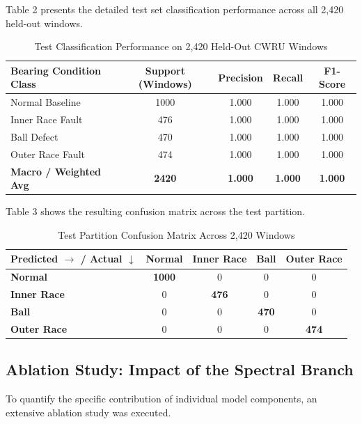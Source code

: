 \documentclass[10pt,journal,onecolumn]{IEEEtran}
\begin{document}
Table 2 presents the detailed test set classification performance across all 2,420 held-out windows.

\begin{table}[htbp]
\caption{Test Classification Performance on 2,420 Held-Out CWRU Windows}
\begin{center}
\begin{tabular}{lcccc}
\toprule
\textbf{Bearing Condition Class} & \textbf{Support (Windows)} & \textbf{Precision} & \textbf{Recall} & \textbf{F1-Score} \\
\midrule
Normal Baseline & 1000 & 1.000 & 1.000 & 1.000 \\
Inner Race Fault & 476 & 1.000 & 1.000 & 1.000 \\
Ball Defect & 470 & 1.000 & 1.000 & 1.000 \\
Outer Race Fault & 474 & 1.000 & 1.000 & 1.000 \\
\midrule
\textbf{Macro / Weighted Avg} & \textbf{2420} & \textbf{1.000} & \textbf{1.000} & \textbf{1.000} \\
\bottomrule
\end{tabular}
\end{center}
\label{tab:metrics}
\end{table}

Table 3 shows the resulting confusion matrix across the test partition.

\begin{table}[htbp]
\caption{Test Partition Confusion Matrix Across 2,420 Windows}
\begin{center}
\begin{tabular}{lcccc}
\toprule
\textbf{Predicted $\to$ / Actual $\downarrow$} & \textbf{Normal} & \textbf{Inner Race} & \textbf{Ball} & \textbf{Outer Race} \\
\midrule
\textbf{Normal} & \textbf{1000} & 0 & 0 & 0 \\
\textbf{Inner Race} & 0 & \textbf{476} & 0 & 0 \\
\textbf{Ball} & 0 & 0 & \textbf{470} & 0 \\
\textbf{Outer Race} & 0 & 0 & 0 & \textbf{474} \\
\bottomrule
\end{tabular}
\end{center}
\label{tab:cm}
\end{table}

\subsection{Ablation Study: Impact of the Spectral Branch}
To quantify the specific contribution of individual model components, an extensive ablation study was executed.
\end{document}
